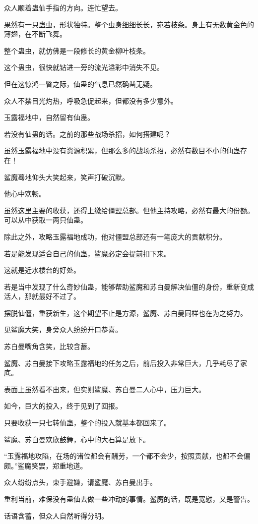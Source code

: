 \begin{this_body}
众人顺着蛊仙手指的方向。连忙望去。

果然有一只蛊虫，形状独特。整个虫身细细长长，宛若枝条。身上有无数黄金色的薄翅，在不断飞舞。

整个蛊虫，就仿佛是一段修长的黄金柳叶枝条。

这个蛊虫，很快就钻进一旁的流光溢彩中消失不见。

但在这惊鸿一瞥之际，仙蛊的气息已然确凿无疑。

众人不禁目光灼热，呼吸急促起来，但都没有多少意外。

玉露福地中，自然留有仙蛊。

若没有仙蛊的话。之前的那些战场杀招，如何搭建呢？

虽然玉露福地中没有资源积累，但那么多的战场杀招，必然有数目不小的仙蛊存在！

鲨魔蓦地仰头大笑起来，笑声打破沉默。

他心中欢畅。

虽然这里主要的收获，还得上缴给僵盟总部。但他主持攻略，必然有最大的份额。可以从中获取一两只仙蛊。

除此之外，攻略玉露福地成功，他对僵盟总部还有一笔庞大的贡献积分。

若是能发现适合自己的仙蛊，鲨魔必定会提前扣下来。

这就是近水楼台的好处。

若是当中发现了什么奇妙仙蛊，能够帮助鲨魔和苏白曼解决仙僵的身份，重新变成活人，那就最好不过了。

摆脱仙僵，重获新生，这个期望不止是方源，鲨魔、苏白曼同样也在为之努力。

见鲨魔大笑，身旁众人纷纷开口恭喜。

苏白曼嘴角含笑，比较含蓄。

鲨魔、苏白曼接下攻略玉露福地的任务之后，前后投入非常巨大，几乎耗尽了家底。

表面上虽然看不出来，但实则鲨魔、苏白曼二人心中，压力巨大。

如今，巨大的投入，终于见到了回报。

只要收获一只七转仙蛊，整个的投入就基本都回来了。

鲨魔、苏白曼欢欣鼓舞，心中的大石算是放下。

“玉露福地攻陷，在场的诸位都会有酬劳，一个都不会少，按照贡献，也都不会偏颇。”鲨魔笑罢，郑重地道。

众人纷纷点头，束手避嫌，请鲨魔、苏白曼出手。

重利当前，难保没有蛊仙去做一些冲动的事情。鲨魔的话，既是宽慰，又是警告。

话语含蓄，但众人自然听得分明。


\end{this_body}
